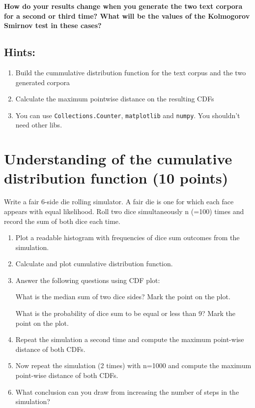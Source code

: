 \documentclass{WeSTassignment}
\begin{document}
\textbf{How do your results change when you generate the two text corpora for a second or third time? What will be the values of the Kolmogorov Smirnov test in these cases?}

\subsection{Hints:}
\begin{enumerate}
\item Build the cummulative distribution function for the text corpus and the two generated corpora
\item Calculate the maximum pointwise distance on the resulting CDFs
\item You can use \texttt{Collections.Counter}, \texttt{matplotlib} and \texttt{numpy}. You shouldn't need other libs. 
\end{enumerate}




\section{Understanding of the cumulative distribution function (10 points)}

Write a fair 6-side die rolling simulator. A fair die is one for which each face appears with equal likelihood. Roll two dice simultaneously n (=100) times and record the sum of both dice each time. 

\begin{enumerate}
\item Plot a readable histogram with frequencies of dice sum outcomes from the simulation. 
\item Calculate and plot cumulative distribution function.
\item Answer the following questions using CDF plot:

What is the median sum of two dice sides?  Mark the point on the plot.

What is the probability of dice sum to be equal or less than 9? Mark the point on the plot.

\item Repeat the simulation a second time and compute the maximum point-wise distance of both CDFs.
\item Now repeat the simulation (2 times) with n=1000 and compute the maximum point-wise distance of both CDFs.
\item What conclusion can you draw from increasing the number of steps in the simulation?  

\end{enumerate}
\end{document}

